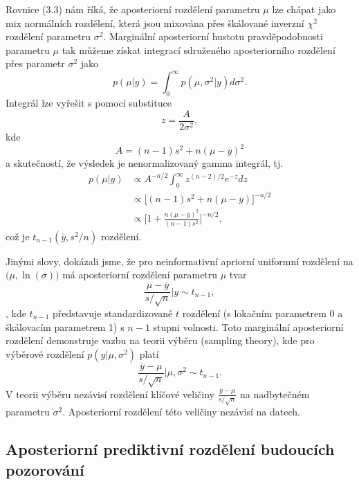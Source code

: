 Rovnice (3.3) nám říká, že aposteriorní rozdělení parametru $\mu$ lze chápat jako mix normálních rozdělení, která jsou mixována přes škálované inverzní $\chi^2$ rozdělení parametru $\sigma^2$. Marginální aposteriorní hustotu pravděpodobnosti parametru $\mu$ tak můžeme získat integrací sdruženého aposteriorního rozdělení přes parametr $\sigma^2$ jako
\begin{equation}
p(\mu | y) = \int_0^{\infty} p(\mu, \sigma^2 | y) d \sigma^2.
\end{equation}
Integrál lze vyřešit s pomocí substituce
\begin{equation}
z = \frac{A}{2 \sigma^2},
\end{equation}
kde
\begin{equation}
A = (n - 1)s^2 + n(\mu - \overline{y})^2
\end{equation}
a skutečností, že výsledek je nenormalizovaný gamma integrál, tj.
\begin{equation}
\begin{split}
p(\mu | y) & \varpropto A^{-n / 2} \int_0^{\infty} z^{(n - 2) / 2} e^{-z} dz\\
 & \varpropto \Big[(n - 1)s^2 + n(\mu - \overline{y})\Big]^{-n / 2}\\
 & \varpropto \Big[1 + \frac{n(\mu - \overline{y}) ^ 2}{(n - 1) s^2} \Big] ^ {-n / 2},
\end{split}
\end{equation}
což je $t_{n - 1}(\overline{y}, s^2 / n)$ rozdělení.

Jinými slovy, dokázali jsme, že pro neinformativní apriorní uniformní rozdělení na $\big(\mu, \ln(\sigma)\big)$ má aposteriorní rozdělení parametru $\mu$ tvar
\begin{equation}
\frac{\mu - \overline{y}}{s / \sqrt{n}} | y \sim t_{n - 1},
\end{equation},
kde $t_{n - 1}$ představuje standardizované $t$ rozdělení (s lokačním parametrem 0 a škálovacím parametrem 1) s $n - 1$ stupni volnosti. Toto marginální aposteriorní rozdělení demonstruje vazbu na teorii výběru (sampling theory), kde pro výběrové rozdělení $p(y | \mu, \sigma^2)$ platí
\begin{equation}
\frac{\overline{y} - \mu}{s / \sqrt{n}} | \mu, \sigma^2 \sim t_{n - 1}.
\end{equation}
V teorii výběru nezávisí rozdělení klíčové veličiny $\frac{\overline{y} - \mu}{s / \sqrt{n}}$ na nadbytečném parametru $\sigma^2$. Aposteriorní rozdělení této veličiny nezávisí na datech.

\subsection{Aposteriorní prediktivní rozdělení budoucích pozorování}

